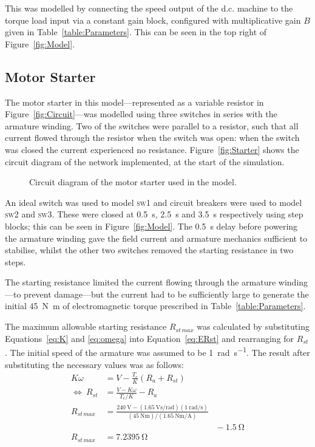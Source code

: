 \documentclass[a4paper,11pt,twocolumn]{article}
\newcommand{\s}{\si{\second}\xspace}
\newcommand{\V}{\si{\volt}\xspace}
\newcommand{\Ohm}{\si{\ohm}\xspace}
\newcommand{\Nm}{\si{\newton\metre}\xspace}
\newcommand{\rps}{\si{\radian\per\second}\xspace}
\newcommand{\Vspr}{\si{\volt\second\per\radian}\xspace}
\newcommand{\NmpA}{\si{\newton\metre\per\ampere}\xspace}
\newcommand{\DC}{d.c.\xspace}
\newcommand{\SW}[1]{\textsc{sw\footnotesize#1}\xspace}
\begin{document}
This was modelled by connecting the speed output of the \DC machine to the 
torque load input via a constant gain block, configured with multiplicative 
gain $B$ given in Table~\ref{table:Parameters}. This can be seen in the top 
right of Figure~\ref{fig:Model}.

\subsection{Motor Starter} \label{sec:MotorStarter}

The motor starter in this model---represented as a variable resistor in 
Figure~\ref{fig:Circuit}---was modelled using three switches in series with the 
armature winding. Two of the switches were parallel to a resistor, such that 
all current flowed through the resistor when the switch was open: when the 
switch was closed the current experienced no resistance. 
Figure~\vref{fig:Starter} shows the circuit diagram of the network implemented, 
at the start of the simulation.
\begin{figure}[h]
    \centering
    \def\svgwidth{0.48\textwidth}
    
    \caption{Circuit diagram of the motor starter used in the model.}
    \label{fig:Starter}
\end{figure}

An ideal switch was used to model \SW{1} and circuit breakers were used to 
model \SW{2} and \SW{3}. These were closed at 0.5~\s, 2.5~\s and 3.5~\s 
respectively using step blocks; this can be seen in Figure~\vref{fig:Model}. 
The 0.5~\s delay before powering the armature winding gave the field current 
and armature mechanics sufficient to stabilise, whilst the other two switches 
removed the starting resistance in two steps.

The starting resistance limited the current flowing through the armature 
winding---to prevent damage---but the current had to be sufficiently large to 
generate the initial 45~\Nm of electromagnetic torque prescribed in 
Table~\ref{table:Parameters}.

The maximum allowable starting resistance $R_{st\,max}$ was calculated by 
substituting Equations~\ref{eq:K} and \ref{eq:omega} into 
Equation~\ref{eq:ERst} and rearranging for $R_{st}$. The initial speed of the 
armature was assumed to be 1~\rps. The result after substituting the necessary 
values was as follows:
\begin{align*}
    K \omega &= V - \frac{T_e}{K}(R_a + R_{st}) \\
    \Leftrightarrow~ R_{st} &= \frac{V - K\omega}{T_e/K} - R_a \\
    R_{st\,max} &= \frac{240~\V - (1.65~\Vspr)(1~\rps)}{(45~\Nm)/(1.65~\NmpA)}\\
        &\hspace{13em} - 1.5~\Ohm \\
    R_{st\,max} &= 7.2395~\Ohm
\end{align*}
\end{document}
